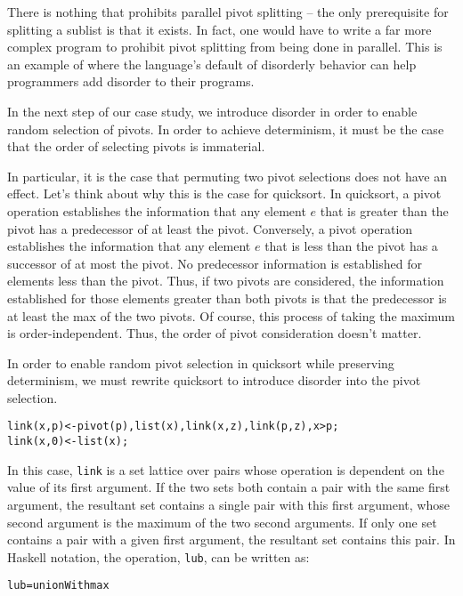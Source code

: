 There is nothing that prohibits parallel pivot splitting -- the only prerequisite for splitting a sublist is that it exists.  In fact, one would have to write a far more complex program to prohibit pivot splitting from being done in parallel.  This is an example of where the language's default of disorderly behavior can help programmers add disorder to their programs.

In the next step of our case study, we introduce disorder in order to enable random selection of pivots.  In order to achieve determinism, it must be the case that the order of selecting pivots is immaterial.

In particular, it is the case that permuting two pivot selections does not have an effect.  Let's think about why this is the case for quicksort. In quicksort, a pivot operation establishes the information that any element $e$ that is greater than the pivot has a predecessor of at least the pivot.  Conversely, a pivot operation establishes the information that any element $e$ that is less than the pivot has a successor of at most the pivot.  No predecessor information is established for elements less than the pivot.  Thus, if two pivots are considered, the information established for those elements greater than both pivots is that the predecessor is at least the max of the two pivots.  Of course, this process of taking the maximum is order-independent.  Thus, the order of pivot consideration doesn’t matter.

In order to enable random pivot selection in quicksort while preserving determinism, we must rewrite quicksort to introduce disorder into the pivot selection.

\begin{alltt}
link(x,p) <- pivot(p), list(x), link(x,z), link(p,z), x > p;
link(x,0) <- list(x);
\end{alltt}

In this case, {\tt link} is a set lattice over pairs whose operation is dependent on the value of its first argument.  If the two sets both contain a pair with the same first argument, the resultant set contains a single pair with this first argument, whose second argument is the maximum of the two second arguments.  If only one set contains a pair with a given first argument, the resultant set contains this pair.  In Haskell notation, the operation, {\tt lub}, can be written as:
\begin{alltt}
lub = unionWith max
\end{alltt}

